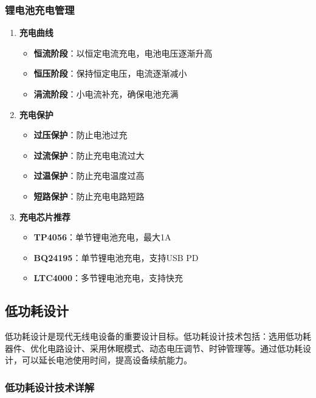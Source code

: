 \documentclass[12pt,UTF8]{ctexbook}
\begin{document}
\subsubsection{锂电池充电管理}

\begin{enumerate}
    \item \textbf{充电曲线}
    \begin{itemize}
        \item \textbf{恒流阶段}：以恒定电流充电，电池电压逐渐升高
        \item \textbf{恒压阶段}：保持恒定电压，电流逐渐减小
        \item \textbf{涓流阶段}：小电流补充，确保电池充满
    \end{itemize}
    
    \item \textbf{充电保护}
    \begin{itemize}
        \item \textbf{过压保护}：防止电池过充
        \item \textbf{过流保护}：防止充电电流过大
        \item \textbf{过温保护}：防止充电温度过高
        \item \textbf{短路保护}：防止充电电路短路
    \end{itemize}
    
    \item \textbf{充电芯片推荐}
    \begin{itemize}
        \item \textbf{TP4056}：单节锂电池充电，最大1A
        \item \textbf{BQ24195}：单节锂电池充电，支持USB PD
        \item \textbf{LTC4000}：多节锂电池充电，支持快充
    \end{itemize}
\end{enumerate}

\subsection{低功耗设计}

低功耗设计是现代无线电设备的重要设计目标。低功耗设计技术包括：选用低功耗器件、优化电路设计、采用休眠模式、动态电压调节、时钟管理等。通过低功耗设计，可以延长电池使用时间，提高设备续航能力。

\subsubsection{低功耗设计技术详解}
\end{document}
